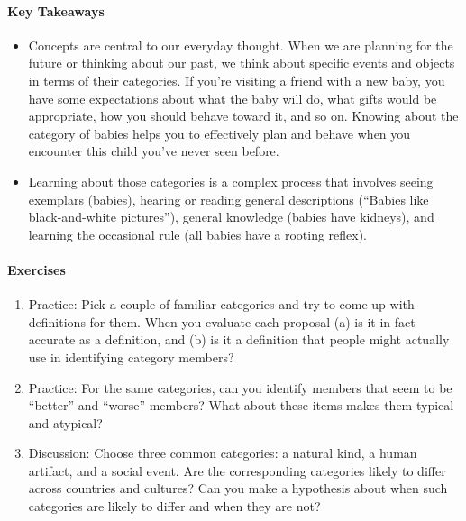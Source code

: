 \documentclass[
]{krantz}
\providecommand{\tightlist}{%
  \setlength{\itemsep}{0pt}\setlength{\parskip}{0pt}}
\begin{document}
\hypertarget{key-takeaways-6}{%
\paragraph*{Key Takeaways}\label{key-takeaways-6}}

\begin{itemize}
\tightlist
\item
  Concepts are central to our everyday thought. When we are planning for the future or thinking about our past, we think about specific events and objects in terms of their categories. If you're visiting a friend with a new baby, you have some expectations about what the baby will do, what gifts would be appropriate, how you should behave toward it, and so on. Knowing about the category of babies helps you to effectively plan and behave when you encounter this child you've never seen before.
\item
  Learning about those categories is a complex process that involves seeing exemplars (babies), hearing or reading general descriptions (``Babies like black-and-white pictures''), general knowledge (babies have kidneys), and learning the occasional rule (all babies have a rooting reflex).
\end{itemize}

\hypertarget{exercises-6}{%
\paragraph*{Exercises}\label{exercises-6}}

\begin{enumerate}
\def\labelenumi{\arabic{enumi}.}
\tightlist
\item
  Practice: Pick a couple of familiar categories and try to come up with definitions for them. When you evaluate each proposal (a) is it in fact accurate as a definition, and (b) is it a definition that people might actually use in identifying category members?
\item
  Practice: For the same categories, can you identify members that seem to be ``better'' and ``worse'' members? What about these items makes them typical and atypical?
\item
  Discussion: Choose three common categories: a natural kind, a human artifact, and a social event. Are the corresponding categories likely to differ across countries and cultures? Can you make a hypothesis about when such categories are likely to differ and when they are not?
\end{enumerate}
\end{document}
